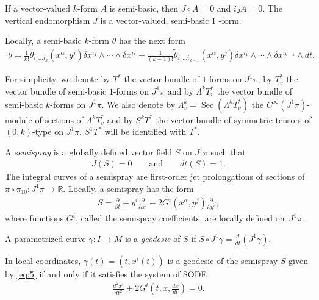 If a vector-valued $k$-form $A$ is semi-basic, then $J\circ A=0$
and $i_{J}A=0$. The vertical endomorphism $J$ is a vector-valued,
semi-basic $1$ -form.

Locally, a semi-basic $k$-form $\theta$ has the next form \begin{eqnarray*}
\theta=\frac{1}{k!}\theta_{i_{1}\dots i_{k}}(x^{\alpha},y^{j})\delta x^{i_{1}}\wedge\cdots\wedge\delta x^{i_{k}}+\frac{1}{(k-1)!}\widetilde{\theta}_{i_{1}\dots i_{k-1}}(x^{\alpha},y^{j})\delta x^{i_{1}}\wedge\cdots\wedge\delta x^{i_{k-1}}\wedge dt.\end{eqnarray*}


For simplicity, we denote by $T^{*}$ the vector bundle of $1$-forms
on $J^{1}\pi$, by $T_{v}^{*}$ the vector bundle of semi-basic $1$-forms
on $J^{1}\pi$ and by $\Lambda^{k}T_{v}^{*}$ the vector bundle of
semi-basic $k$-forms on $J^{1}\pi$. We also denote by $\Lambda_{v}^{k}=\operatorname{Sec}\left(\Lambda^{k}T_{v}^{*}\right)$
the $C^{\infty}(J^{1}\pi)$-module of sections of $\Lambda^{k}T_{v}^{*}$
and by $S^{k}T^{*}$ the vector bundle of symmetric tensors of $(0,k)$-type
on $J^{1}\pi$. $S^{1}T^{*}$ will be identif\/ied with $T^{*}$.

A \emph{semispray} is a globally def\/ined vector f\/ield $S$ on $J^{1}\pi$
such that \begin{gather*}
J(S)=0\qquad\textrm{and}\qquad dt(S)=1.%
\end{gather*}
 The integral curves of a semispray are f\/irst-order jet prolongations
of sections of $\pi\circ\pi_{10}:\!  J^{1}\pi\!\rightarrow\!\mathbb{R}$.
Locally, a semispray has the form{\samepage \begin{gather}
S=\frac{\partial}{\partial t}+y^{i}\frac{\partial}{\partial x^{i}}-2G^{i}(x^{\alpha},y^{j})\frac{\partial}{\partial y^{i}},\label{eq:5}
\end{gather}
 where functions $G^{i}$, called the semispray coef\/f\/icients, are
locally def\/ined on~$J^{1}\pi$.}

A parametrized curve $\gamma:  I\rightarrow M$ is a \emph{geodesic}
of $S$ if $S\circ J^{1}\gamma=\frac{d}{dt}(J^{1}\gamma).$

In local coordinates, $\gamma(t)=(t,x^{i}(t))$ is a geodesic of the
semispray $S$ given by \eqref{eq:5} if and only if it satisf\/ies
the system of SODE \begin{gather}
\frac{d^{2}x^{i}}{dt^{2}}+2G^{i}\left(t,x,\frac{dx}{dt}\right)=0.\label{sode}
\end{gather}


